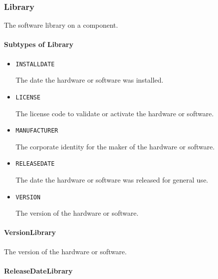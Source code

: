 \FloatBarrier

\subsubsection{Library}
\label{sec:Library}



The software library on a component.



\paragraph{Subtypes of Library}\mbox{}
\label{sec:Subtypes of Library}

\begin{itemize}

\item \texttt{INSTALL\textunderscore DATE}


The date the hardware or software was installed.

\item \texttt{LICENSE}


The license code to validate or activate the hardware or software.

\item \texttt{MANUFACTURER}


The corporate identity for the maker of the hardware or software.


\item \texttt{RELEASE\textunderscore DATE}


The date the hardware or software was released for general use.


\item \texttt{VERSION}


The version of the hardware or software.


\end{itemize}

\paragraph{VersionLibrary}\mbox{}
\label{sec:VersionLibrary}


The version of the hardware or software.


\paragraph{ReleaseDateLibrary}\mbox{}
\label{sec:ReleaseDateLibrary}


